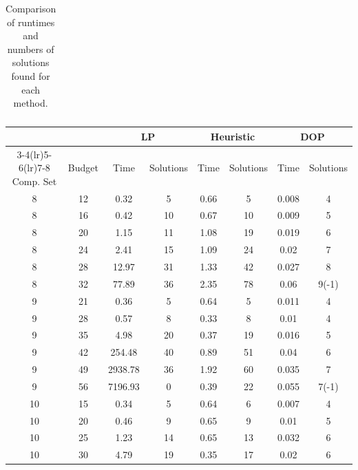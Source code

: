 \documentclass[11pt,authoryear,a4paper]{article}
\theoremstyle{definition}
\begin{document}
\begin{table}[tbp]
\begin{tabular}{cccccccc}
        
    \end{tabular}
    \caption{Comparison of runtimes and numbers of solutions found for each method.}
    \label{tab:runtimes1}
\end{table}

\begin{table}[tbp]
    \centering
    \begin{tabular}{cccccccc}\toprule
    & & \multicolumn{2}{c}{LP}& \multicolumn{2}{c}{Heuristic} & \multicolumn{2}{c}{DOP}\\ \cmidrule(lr){3-4}\cmidrule(lr){5-6}\cmidrule(lr){7-8}
    Comp. Set & Budget & Time    & Solutions & Time & Solutions & Time  & Solutions \\
8         & 12     & 0.32    & 5         & 0.66 & 5         & 0.008 & 4         \\
8         & 16     & 0.42    & 10        & 0.67 & 10        & 0.009 & 5         \\
8         & 20     & 1.15    & 11        & 1.08 & 19        & 0.019 & 6         \\
8         & 24     & 2.41    & 15        & 1.09 & 24        & 0.02  & 7         \\
8         & 28     & 12.97   & 31        & 1.33 & 42        & 0.027 & 8         \\
8         & 32     & 77.89   & 36        & 2.35 & 78        & 0.06  & 9(-1)\\
9         & 21     & 0.36    & 5         & 0.64 & 5         & 0.011 & 4         \\
9         & 28     & 0.57    & 8         & 0.33 & 8         & 0.01  & 4         \\
9         & 35     & 4.98    & 20        & 0.37 & 19        & 0.016 & 5         \\
9         & 42     & 254.48  & 40        & 0.89 & 51        & 0.04  & 6         \\
9         & 49     & 2938.78 & 36        & 1.92 & 60        & 0.035 & 7         \\
9         & 56     & 7196.93 & 0         & 0.39 & 22        & 0.055 & 7(-1)\\
10        & 15     & 0.34    & 5         & 0.64 & 6         & 0.007 & 4         \\
10        & 20     & 0.46    & 9         & 0.65 & 9         & 0.01  & 5         \\
10        & 25     & 1.23    & 14        & 0.65 & 13        & 0.032 & 6         \\
10        & 30     & 4.79    & 19        & 0.35 & 17        & 0.02  & 6         \\

\end{tabular}
\end{table}
\end{document}

